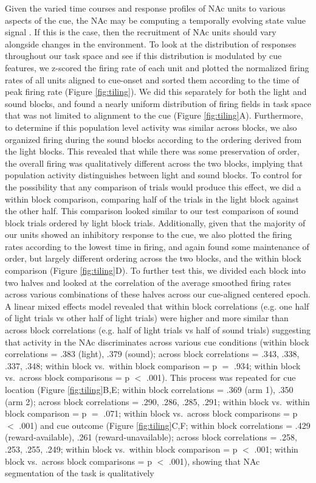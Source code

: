 \documentclass[11pt]{article}
\let\cite=\citep
\begin{document}
Given the varied time courses and response profiles of NAc units to various
aspects of the cue, the NAc may be computing a temporally evolving state value
signal \cite{Pennartz2011}. If this is the case, then the recruitment of NAc units
should vary alongside changes in the environment. To look at the distribution of
responses throughout our task space and see if this distribution is modulated by
cue features, we z-scored the firing rate of each unit and plotted the
normalized firing rates of all units aligned to cue-onset and sorted them
according to the time of peak firing rate (Figure \ref{fig:tiling}). We did this
separately for both the light and sound blocks, and found a nearly uniform
distribution of firing fields in task space that was not limited to alignment to
the cue (Figure \ref{fig:tiling}A). Furthermore, to determine if this population
level activity was similar across blocks, we also organized firing during the
sound blocks according to the ordering derived from the light blocks. This revealed that while there was some preservation of order, the overall firing was qualitatively different
across the two blocks, implying that population activity distinguishes between light and sound blocks. To control for the possibility that any comparison of
trials would produce this effect, we did a within block comparison, comparing
half of the trials in the light block against the other half. This comparison
looked similar to our test comparison of sound block trials ordered by light
block trials. Additionally, given that the majority of our units showed an
inhibitory response to the cue, we also plotted the firing rates according to
the lowest time in firing, and again found some maintenance of order, but
largely different ordering across the two blocks, and the within block
comparison (Figure \ref{fig:tiling}D). To further test this, we divided each
block into two halves and looked at the correlation of the average smoothed
firing rates across various combinations of these halves across our cue-aligned
centered epoch. A linear mixed effects model revealed that within block
correlations (e.g. one half of light trials vs other half of light trials) were
higher and more similar than across block correlations (e.g. half of light
trials vs half of sound trials) suggesting that activity in the NAc
discriminates across various cue conditions (within block correlations = .383 (light), .379 (sound); across block correlations = .343, .338, .337, .348; within block vs.\ within block comparison = p $=$ .934; within block vs.\ across block comparisons = p $<$ .001). This process was repeated for cue location (Figure \ref{fig:tiling}B,E; within block correlations = .369 (arm 1), .350 (arm 2); across block correlations = .290, .286, .285, .291; within block vs.\ within block comparison = p $=$ .071; within block vs.\ across block comparisons = p $<$ .001) and cue outcome (Figure \ref{fig:tiling}C,F;  within block correlations = .429 (reward-available), .261 (reward-unavailable); across block correlations = .258, .253, .255, .249; within block vs.\ within block comparison = p $<$ .001; within block vs.\ across block comparisons = p $<$ .001), showing that NAc segmentation of the task is qualitatively
\end{document}
